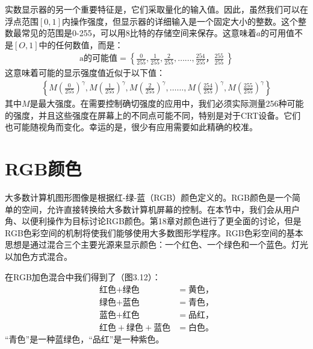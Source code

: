 \documentclass[lang=cn,12pt,marginpar=margintrue]{elegantbook}
\begin{document}

实数显示器的另一个重要特征是，它们采取量化的输入值。因此，虽然我们可以在浮点范围$[0,1]$内操作强度，但显示器的详细输入是一个固定大小的整数。这个整数最常见的范围是0-255，可以用8比特的存储空间来保存。这意味着$a$的可用值不是$[O,1]$中的任何数值，而是：
\[
  \begin{aligned}
    \text{a的可能值} = \left\{ \frac{0}{255},\frac{1}{255},\frac{2}{255},……,\frac{254}{255}，\frac{255}{255}\ \right\}
  \end{aligned}
\]
这意味着可能的显示强度值近似于以下值：
\[
  \begin{aligned}
    \left\{ M(\frac{0}{255})^\gamma ,M(\frac{1}{255})^\gamma ,M(\frac{2}{255})^\gamma ,……,M(\frac{254}{255})^\gamma ,M(\frac{255}{255})^\gamma \right\}
  \end{aligned}
\]
其中$M$是最大强度。在需要控制确切强度的应用中，我们必须实际测量256种可能的强度，并且这些强度在屏幕上的不同点可能不同，特别是对于CRT设备。它们也可能随视角而变化。幸运的是，很少有应用需要如此精确的校准。

\section{RGB颜色}


大多数计算机图形图像是根据红-绿-蓝（RGB）颜色定义的。RGB颜色是一个简单的空间，允许直接转换给大多数计算机屏幕的控制。在本节中，我们会从用户角、以便利操作为目标讨论RGB颜色。第18章对颜色进行了更全面的讨论，但是RGB色彩空间的机制将使我们能够使用大多数图形学程序。RGB色彩空间的基本思想是通过混合三个主要光源来显示颜色：一个红色、一个绿色和一个蓝色。灯光以加色方式混合。

在RGB加色混合中我们得到了（图3.12）：
\[
  \begin{aligned}
    \text{红色} + \text{绿色}             & = \text{黄色}， \\
    \text{绿色} + \text{蓝色}             & = \text{青色}， \\
    \text{蓝色} + \text{红色}             & = \text{品红}， \\
    \text{红色} + \text{绿色} + \text{蓝色} & = \text{白色}。
  \end{aligned}
\]
“青色”是一种蓝绿色，“品红”是一种紫色。
\end{document}
